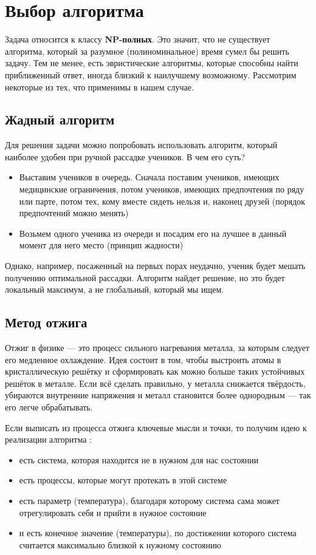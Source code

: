 \documentclass[12pt,a4paper]{extarticle} %
\begin{document}
	\section {Выбор алгоритма}
	
	Задача относится к классу \textbf{NP-полных}. Это значит, что не существует алгоритма, который за разумное (полиноминальное) время сумел бы решить задачу. Тем не менее, есть эвристические алгоритмы, которые способны найти приближенный ответ, иногда близкий к наилучшему возможному. Рассмотрим некоторые из тех, что применимы в нашем случае.
	
	\subsection{Жадный алгоритм}
	Для решения задачи можно попробовать использовать алгоритм, который наиболее удобен при ручной рассадке учеников. В чем его суть?
	
	\begin{itemize}
		\item Выставим учеников в очередь. Сначала поставим учеников, имеющих медицинские ограничения, потом учеников, имеющих предпочтения по ряду или парте, потом тех, кому вместе сидеть нельзя и, наконец друзей (порядок предпочтений можно менять)
		\item  Возьмем одного ученика из очереди и посадим его на лучшее в данный момент для него место (принцип жадности)
	\end{itemize}
	
	Однако, например, посаженный на первых порах неудачно, ученик будет мешать получению оптимальной рассадки. Алгоритм найдет решение, но это будет локальный максимум, а не глобальный, который мы ищем.
	
	\subsection{Метод отжига}
	Отжиг в физике — это процесс сильного нагревания металла, за которым следует его медленное охлаждение. Идея состоит в том, чтобы выстроить атомы в кристаллическую решётку и сформировать как можно больше таких устойчивых решёток в металле. Если всё сделать правильно, у металла снижается твёрдость, убираются внутренние напряжения и металл становится более однородным — так его легче обрабатывать.
	
	Если выписать из процесса отжига ключевые мысли и точки, то получим идею к реализации алгоритма \cite{otzhig-kod}:
	\begin{itemize}
		\item есть система, которая находится не в нужном для нас состоянии
		\item есть процессы, которые могут протекать в этой системе
		\item есть параметр (температура), благодаря которому система сама может отрегулировать себя и прийти в нужное состояние
		\item и есть конечное значение (температуры), по достижении которого система считается максимально близкой к нужному состоянию
	\end{itemize}
	
\end{document}
